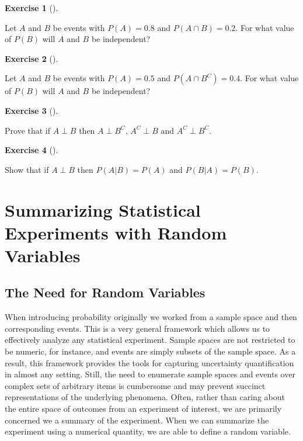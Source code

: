 \documentclass[
  letterpaper,
  DIV=11,
  numbers=noendperiod]{scrreprt}
\theoremstyle{definition}
\theoremstyle{definition}
\newtheorem{exercise}{Exercise}[chapter]
\theoremstyle{definition}
\theoremstyle{remark}
\begin{document}
\begin{exercise}[]\protect\hypertarget{exr-4.13}{}\label{exr-4.13}

Let \(A\) and \(B\) be events with \(P(A) = 0.8\) and
\(P(A \cap B) = 0.2\). For what value of \(P(B)\) will \(A\) and \(B\)
be independent?

\end{exercise}

\begin{exercise}[]\protect\hypertarget{exr-4.14}{}\label{exr-4.14}

Let \(A\) and \(B\) be events with \(P(A) = 0.5\) and
\(P(A \cap B^C) = 0.4\). For what value of \(P(B)\) will \(A\) and \(B\)
be independent?

\end{exercise}

\begin{exercise}[]\protect\hypertarget{exr-4.15}{}\label{exr-4.15}

Prove that if \(A\perp B\) then \(A\perp B^C\), \(A^C \perp B\) and
\(A^C \perp B^C\).

\end{exercise}

\begin{exercise}[]\protect\hypertarget{exr-4.16}{}\label{exr-4.16}

Show that if \(A\perp B\) then \(P(A|B) = P(A)\) and \(P(B|A) = P(B)\).

\end{exercise}

\chapter{Summarizing Statistical Experiments with Random
Variables}\label{summarizing-statistical-experiments-with-random-variables}

\section{The Need for Random
Variables}\label{the-need-for-random-variables}

When introducing probability originally we worked from a sample space
and then corresponding events. This is a very general framework which
allows us to effectively analyze any statistical experiment. Sample
spaces are not restricted to be numeric, for instance, and events are
simply subsets of the sample space. As a result, this framework provides
the tools for capturing uncertainty quantification in almost any
setting. Still, the need to enumerate sample spaces and events over
complex sets of arbitrary items is cumbersome and may prevent succinct
representations of the underlying phenomena. Often, rather than caring
about the entire space of outcomes from an experiment of interest, we
are primarily concerned we a summary of the experiment. When we can
summarize the experiment using a numerical quantity, we are able to
define a random variable.
\end{document}

